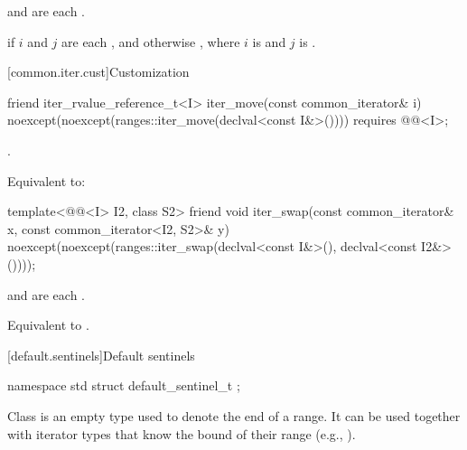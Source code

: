 \begin{itemdescr}
\pnum
\expects
{} and 
are each .

\pnum
\returns
{} if $i$ and $j$ are each , and otherwise
, where
$i$ is  and $j$ is .
\end{itemdescr}

[common.iter.cust]{Customization}

%
\begin{itemdecl}
friend iter_rvalue_reference_t<I> iter_move(const common_iterator& i)
  noexcept(noexcept(ranges::iter_move(declval<const I&>())))
    requires @@<I>;
\end{itemdecl}

\begin{itemdescr}
\pnum
\expects
{}.

\pnum
\effects
Equivalent to: 
\end{itemdescr}

%
\begin{itemdecl}
template<@@<I> I2, class S2>
  friend void iter_swap(const common_iterator& x, const common_iterator<I2, S2>& y)
    noexcept(noexcept(ranges::iter_swap(declval<const I&>(), declval<const I2&>())));
\end{itemdecl}

\begin{itemdescr}
\pnum
\expects
{} and 
are each .

\pnum
\effects
Equivalent to .
\end{itemdescr}

[default.sentinels]{Default sentinels}

%
\begin{itemdecl}
namespace std {
  struct default_sentinel_t { };
}
\end{itemdecl}

\pnum
Class  is an empty type used to denote the end of a
range. It can be used together with iterator types that know the bound
of their range (e.g., ).

